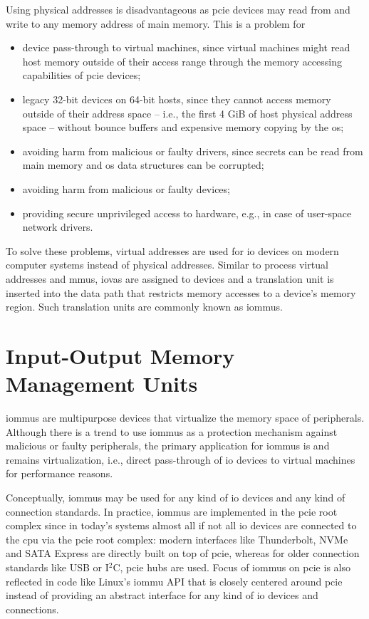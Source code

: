 Using physical addresses is disadvantageous as \ac{pcie} devices may read from
and write to any memory address of main memory. This is a problem for

\begin{itemize}
    \item device pass-through to virtual machines, since virtual machines might
        read host memory outside of their access range through the memory
        accessing capabilities of \ac{pcie} devices;
    \item legacy 32-bit devices on 64-bit hosts, since they cannot access memory
        outside of their address space -- i.e., the first 4 GiB of host physical
        address space -- without bounce buffers and expensive memory copying by
        the \ac{os};
    \item avoiding harm from malicious or faulty drivers, since secrets can be
        read from main memory and \ac{os} data structures can be corrupted;
    \item avoiding harm from malicious or faulty devices;
    \item providing secure unprivileged access to hardware, e.g., in case of
        user-space network drivers.
\end{itemize}

To solve these problems, virtual addresses are used for \ac{io} devices on
modern computer systems instead of physical addresses. Similar to process
virtual addresses and \acp{mmu}, \acp{iova} are assigned to devices and a
translation unit is inserted into the data path that restricts memory accesses
to a device's memory region. Such translation units are commonly known as
\acfp{iommu}.


\section{Input-Output Memory Management Units}
\label{sec:iommus}

\acp{iommu} are multipurpose devices that virtualize the memory space of
peripherals. Although there is a trend to use \acp{iommu} as a protection
mechanism against malicious or faulty peripherals, the primary application for
\acp{iommu} is and remains virtualization, i.e., direct pass-through of \ac{io}
devices to virtual machines for performance reasons.

Conceptually, \acp{iommu} may be used for any kind of \ac{io} devices and any
kind of connection standards. In practice, \acp{iommu} are implemented in the
\ac{pcie} root complex since in today's systems almost all if not all \ac{io}
devices are connected to the \ac{cpu} via the \ac{pcie} root complex: modern
interfaces like Thunderbolt, NVMe and SATA Express are directly built on top of
\ac{pcie}, whereas for older connection standards like USB or I$^2$C, \ac{pcie}
hubs are used. Focus of \acp{iommu} on \ac{pcie} is also reflected in code like
Linux's \ac{iommu} API that is closely centered around \ac{pcie} instead of
providing an abstract interface for any kind of \ac{io} devices and connections.

